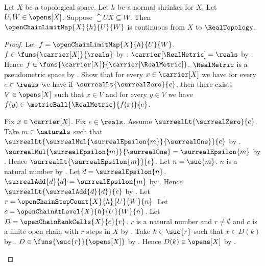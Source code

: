 \begin{theorem}\label{open_chain_limit_map_continuous_real}
    Let $X$ be a topological space.
    Let $h$ be a normal shrinker for $X$.
    Let $U,W\in\opens[X]$.
    Suppose $\closure{U}{X}\subseteq W$.
    Then $\openChainLimitMap{X}{h}{U}{W}$ is continuous from
        $X$ to $\RealTopology$.
\end{theorem}
\begin{proof}
    Let $f=\openChainLimitMap{X}{h}{U}{W}$.
    $f\in\funs{\carrier[X]}{\reals}$
        by .
    $\carrier[\RealMetric]=\reals$
        by .
    Hence $f\in\funs{\carrier[X]}{\carrier[\RealMetric]}$.
    $\RealMetric$ is a pseudometric space by
        .
    Show that for every $x\in\carrier[X]$ we have
        for every $e\in\reals$ we have if
            $\surrealLt{\surrealZero}{e}$, then there exists
            $V\in\opens[X]$ such that $x\in V$ and
            for every $y\in V$ we have
                $f(y)\in\metricBall{\RealMetric}{f(x)}{e}$.
    \begin{subproof}
        Fix $x\in\carrier[X]$.
        Fix $e\in\reals$.
        Assume $\surrealLt{\surrealZero}{e}$.
        Take $m\in\naturals$ such that
            $\surrealLt{
                \surrealMul{\surrealEpsilon{m}}{\surrealOne}}{e}$
            by
            .
        $\surrealMul{\surrealEpsilon{m}}{\surrealOne}
            =\surrealEpsilon{m}$
            by
            .
        Hence $\surrealLt{\surrealEpsilon{m}}{e}$.
        Let $n=\suc{m}$.
        $n$ is a natural number by .
        Let $d=\surrealEpsilon{n}$.
        $\surrealAdd{d}{d}=\surrealEpsilon{m}$
            by .
        Hence $\surrealLt{\surrealAdd{d}{d}}{e}$ by \auto.
        Let $r=\openChainStepCount{X}{h}{U}{W}{n}$.
        Let $c=\openChainAtLevel{X}{h}{U}{W}{n}$.
        Let $D=\openChainRankCells{X}{c}{r}$.
        $r$ is a natural number and $r\neq\emptyset$ and
            $c$ is a finite open chain with $r$ steps in $X$
            by .
        Take $k\in\suc{r}$ such that $x\in D(k)$
            by .
        $D\in\funs{\suc{r}}{\opens[X]}$
            by .
        Hence $D(k)\in\opens[X]$ by .

\end{subproof}
\end{proof}
